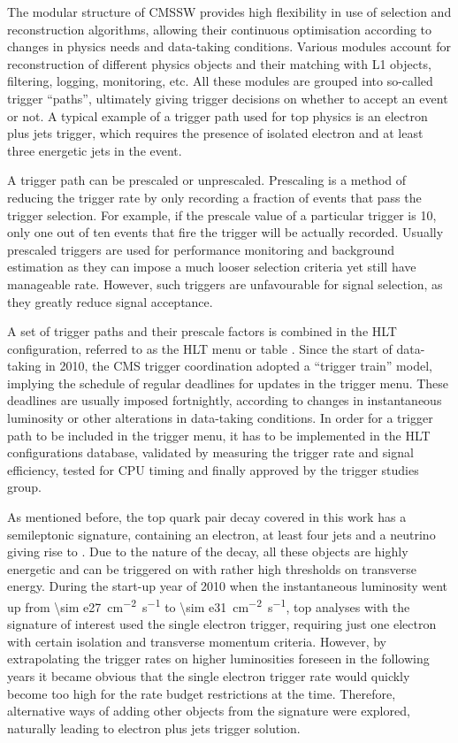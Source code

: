 The modular structure of CMSSW provides high flexibility in use of selection and reconstruction algorithms, allowing
their continuous optimisation according to changes in physics needs and data-taking conditions. Various modules account
for reconstruction of different physics objects and their matching with L1 objects, filtering, logging, monitoring, etc.
All these modules are grouped into so-called trigger ``paths'', ultimately giving trigger decisions on whether to accept
an event or not. A typical example of a trigger path used for top physics is an electron plus jets trigger, which
requires the presence of isolated electron and at least three energetic jets in the event.

A trigger path can be prescaled or unprescaled. Prescaling is a method of reducing the trigger rate by only recording a
fraction of events that pass the trigger selection. For example, if the prescale value of a particular trigger is 10,
only one out of ten events that fire the trigger will be actually recorded. Usually prescaled triggers are used for
performance monitoring and background estimation as they can impose a much looser selection criteria yet still have
manageable rate. However, such triggers are unfavourable for signal selection, as they greatly reduce signal acceptance.

A set of trigger paths and their prescale factors is combined in the HLT configuration, referred to as the HLT menu or
table \autocite{HLT_commissioning}. Since the start of data-taking in 2010, the CMS trigger coordination adopted a
``trigger train'' model, implying the schedule of regular deadlines for updates in the trigger menu. These deadlines are
usually imposed fortnightly, according to changes in instantaneous luminosity or other alterations in data-taking
conditions. In order for a trigger path to be included in the trigger menu, it has to be implemented in the HLT
configurations database, validated by measuring the trigger rate and signal efficiency, tested for CPU timing and
finally approved by the trigger studies group.

As mentioned before, the top quark pair decay covered in this work has a semileptonic signature, containing an electron,
at least four jets and a neutrino giving rise to \MET. Due to the nature of the decay, all these objects are highly
energetic and can be triggered on with rather high thresholds on transverse energy. During the start-up year of 2010
when the instantaneous luminosity went up from \SI{\sim e27}{\cm^{-2}~s^{-1}} to \SI{\sim e31}{\cm^{-2}~s^{-1}}, top
analyses with the signature of interest used the single electron trigger, requiring just one electron with certain
isolation and transverse momentum criteria. However, by extrapolating the trigger rates on higher luminosities foreseen
in the following years it became obvious that the single electron trigger rate would quickly become too high for the
rate budget restrictions at the time. Therefore, alternative ways of adding other objects from the \ttbar signature were
explored, naturally leading to electron plus jets trigger solution.

